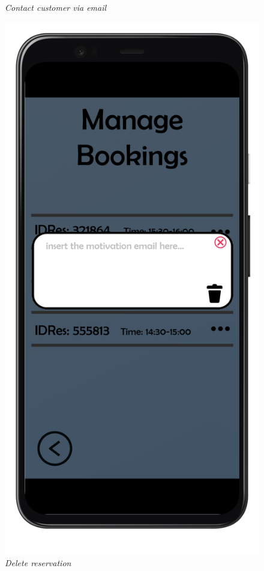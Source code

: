 \documentclass{article}
\begin{document}
\begin{figure}[!h]
\begin{minipage}[!h]{0.4\textwidth}
				\caption{\emph{Contact customer via email}}
			\end{minipage}
			\hfill
			\begin{minipage}[!h]{0.4\textwidth}
				\includegraphics[width=\textwidth]{../Mockups/MBpopup3.png}
				\caption{\emph{Delete reservation}}
			\end{minipage}
		\end{figure}
	
\end{document}
